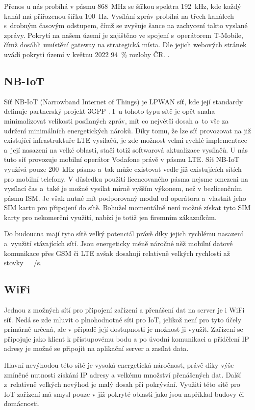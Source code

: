 Přenos u nás probíhá v pásmu \SI{868}{\mega\hertz} se šířkou spektra \SI{192}{\kilo\hertz}, kde každý kanál má přiřazenou šířku \SI{100}{\hertz}. Vysílání zpráv probíhá na třech kanálech s~drobným časovým odstupem, čímž se zvyšuje šance na zachycení takto vyslané zprávy. Pokrytí na našem území je zajištěno ve spojení s~operátorem T-Mobile, čímž dosáhli umístění gateway na strategická místa. Dle jejich webových stránek uvádí pokrytí území v květnu 2022 \SI{94}{\percent} rozlohy ČR. \cite{Sigfox_pokryti}.

\subsection{NB-IoT}

Síť NB-IoT (Narrowband Internet of Things) je LPWAN síť, kde její standardy definuje partnerský projekt 3GPP \cite{3GPP}. I~u tohoto typu sítě je opět snaha minimalizovat velikosti posílaných zpráv, mít co největší dosah a~to vše za udržení minimálních energetických nároků. Díky tomu, že lze síť provozovat na již existující infrastruktuře LTE vysílačů, je zde možnost velmi rychlé implementace a~její nasazení na velké oblasti, stačí totiž softwarová aktualizace vysílačů. U nás tuto síť provozuje mobilní operátor Vodafone právě v pásmu LTE. Síť NB-IoT využívá pouze \SI{200}{\kilo\hertz} pásmo a~tak může existovat vedle již existujících sítích pro mobilní telefony. V důsledku použití licencovaného pásma nejsme omezeni na vysílací čas a~také je možné vysílat mírně vyšším výkonem, než v bezlicenčním pásmu ISM. Je však nutné mít podporovaný modul od operátora a~vlastnit jeho SIM kartu pro připojení do sítě. Bohužel momentálně není možné získat tyto SIM karty pro nekomerční využití, nabízí je totiž jen firemním zákazníkům. 

Do budoucna mají tyto sítě velký potenciál právě díky jejich rychlému nasazení a~využití stávajících sítí. Jsou energeticky méně náročné něž mobilní datové komunikace přes GSM či LTE avšak dosahují relativně velkých rychlostí až stovky~\SI{}{\kilo\bit/\second}.

\subsection{WiFi}

Jednou z možných sítí pro připojení zařízení a přenášení dat na server je i WiFi síť. Nedá se zde mluvit o plnohodnotné síti pro IoT, jelikož není pro tyto účely primárně určená, ale v případě její dostupnosti je možnost ji využít. Zařízení se připojuje jako klient k přístupovému bodu a po úvodní komunikaci a přidělení IP adresy je možné se připojit na aplikační server a zasílat data.

Hlavní nevýhodou této sítě je vysoká energetická náročnost, právě díky výše zmíněné nutnosti získání IP adresy a velkému množství přenášených dat. Další z~relativně velkých nevýhod je malý dosah při pokrývání. Využití této sítě pro IoT zařízení má smysl pouze v již pokryté oblasti jako jsou například budovy či domácnosti.